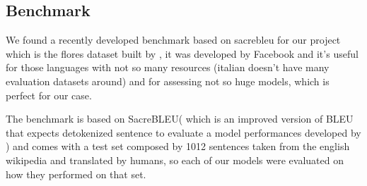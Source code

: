 \subsection{Benchmark}
We found a recently developed benchmark based on sacrebleu for our project which is the flores dataset built by \cite{goyal2021flores}, it was developed by Facebook and it's useful for those languages with not so many resources (italian doesn't have many evaluation datasets around) and for assessing not so huge models, which is perfect for our case.
\vspace{3mm}

The benchmark is based on SacreBLEU( which is an improved version of BLEU that expects detokenized sentence to evaluate a model performances developed by \cite{post2018call}) and comes with a test set composed by 1012 sentences taken from the english wikipedia and translated by humans, so each of our models were evaluated on how they performed on that set.
